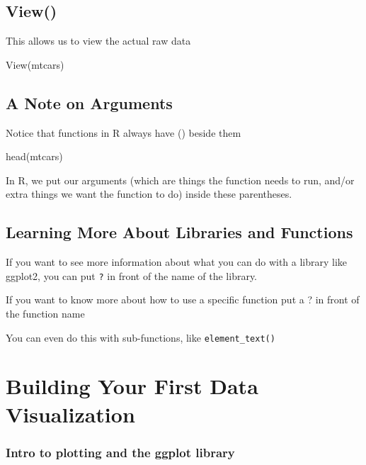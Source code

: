 \documentclass[
]{book}
\newenvironment{Shaded}{\begin{snugshade}}{\end{snugshade}}
\newcommand{\FunctionTok}[1]{\textcolor[rgb]{0.00,0.00,0.00}{#1}}
\newcommand{\NormalTok}[1]{#1}
\begin{document}
\hypertarget{view}{%
\section{View()}\label{view}}

This allows us to view the actual raw data

\begin{Shaded}
\begin{Highlighting}[]
\FunctionTok{View}\NormalTok{(mtcars)}
\end{Highlighting}
\end{Shaded}

\hypertarget{a-note-on-arguments}{%
\section{A Note on Arguments}\label{a-note-on-arguments}}

Notice that functions in R always have () beside them

head(mtcars)

In R, we put our arguments (which are things the function needs to run, and/or extra things we want the function to do) inside these parentheses.

\hypertarget{learning-more-about-libraries-and-functions}{%
\section{Learning More About Libraries and Functions}\label{learning-more-about-libraries-and-functions}}

If you want to see more information about what you can do with a library like ggplot2, you can put \texttt{?} in front of the name of the library.

If you want to know more about how to use a specific function put a ? in front of the function name

You can even do this with sub-functions, like \texttt{element\_text()}

\hypertarget{building-your-first-data-visualization}{%
\chapter{Building Your First Data Visualization}\label{building-your-first-data-visualization}}

\hypertarget{intro-to-plotting-and-the-ggplot-library}{%
\subsection{Intro to plotting and the ggplot library}\label{intro-to-plotting-and-the-ggplot-library}}
\end{document}
